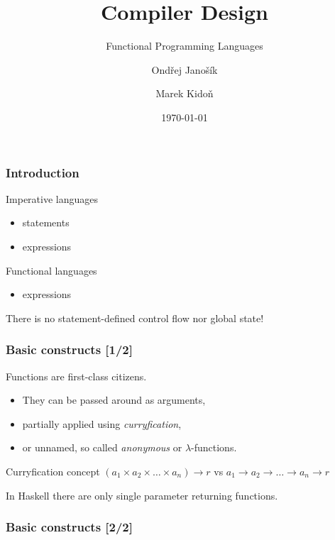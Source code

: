 \documentclass{beamer}
\title{Compiler Design}
\subtitle{Functional Programming Languages}
\author[Ondřej Janošík \and Marek Kidoň]{Ondřej Janošík \and Marek Kidoň}
\institute{Faculty of Information Technology, Brno University of Technology}
\date{\today}
\begin{document}
\frame{\maketitle}

\begin{frame} \frametitle{Introduction}

Imperative languages
  \begin{itemize}
    \item statements
    \item expressions
  \end{itemize}

\vspace{5pt}
Functional languages
  \begin{itemize}
      \item expressions
  \end{itemize}

\vspace{10pt}
There is no statement-defined control flow nor global state!
\end{frame}

\begin{frame} \frametitle{Basic constructs [1/2]}
  Functions are first-class citizens.
  \begin{itemize}
      \item They can be passed around as arguments,
      \item partially applied using \textit{curryfication},
      \item or unnamed, so called \textit{anonymous} or $\lambda$-functions.
  \end{itemize}

  \vspace{10pt}
  Curryfication concept
  $(a_{1} \times a_{2} \times \ldots \times a_{n}) \to r$
  vs
  $a_{1} \to a_{2} \to \ldots \to a_{n} \to r$

  \vspace{5pt}
  In Haskell there are only single parameter returning functions.
\end{frame}

\begin{frame} \frametitle{Basic constructs [2/2]}

\end{frame}
\end{document}
